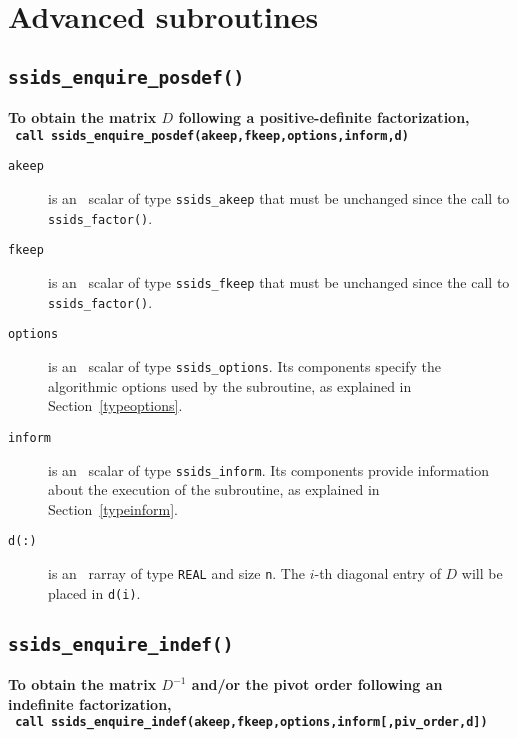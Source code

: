 \documentclass{spral}
\begin{document}
\section{Advanced subroutines}


\subsection{\texttt{ssids\_enquire\_posdef()}}
\textbf{To obtain the matrix $D$ following a positive-definite factorization,
   \vspace*{0.1cm} \\
   \texttt{ \hspace*{0.2cm}
      call ssids\_enquire\_posdef(akeep,fkeep,options,inform,d)
   }
}

\begin{description}

\item[\texttt{akeep}]  is an \intentin\ scalar of type {\tt ssids\_akeep} that
must be unchanged since the call to {\tt ssids\_factor()}.

\item[\texttt{fkeep}]  is an \intentin\ scalar of type {\tt ssids\_fkeep} that
must be unchanged since the call to {\tt ssids\_factor()}.

\item[\texttt{options}] is an \intentin\ scalar of type {\tt ssids\_options}.
Its components specify the algorithmic options used by the subroutine, as
explained in Section~\ref{typeoptions}.

\item[\texttt{inform}] is an \intentout\ scalar of type
{\tt ssids\_inform}. Its components provide information about the execution
of the subroutine, as explained in Section~\ref{typeinform}.

\item[\texttt{d(:)}] is an  \intentout\ rarray of type {\tt  REAL} and
size {\tt n}. The $i$-th diagonal entry of $D$ will be placed in {\tt d(i)}.

\end{description}

\subsection{\texttt{ssids\_enquire\_indef()}}
\textbf{To obtain the matrix $D^{-1}$ and/or the pivot order following an
   indefinite factorization,
   \vspace*{0.1cm} \\
   \texttt{ \hspace*{0.2cm}
     call ssids\_enquire\_indef(akeep,fkeep,options,inform[,piv\_order,d])
   }
}
\end{document}
